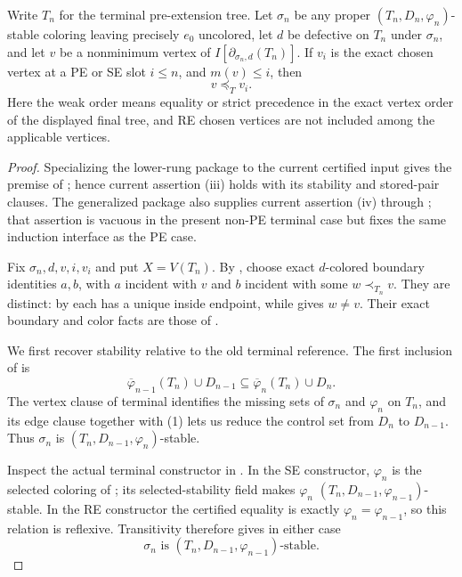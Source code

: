 \begin{helper}
Write \(T_n\) for the terminal pre-extension tree. Let \(\sigma_n\) be
any proper \((T_n,D_n,\varphi_n)\)-stable coloring leaving precisely
\(e_0\) uncolored, let \(d\) be defective on \(T_n\) under \(\sigma_n\),
and let \(v\) be a nonminimum vertex of
\(I[\partial_{\sigma_n,d}(T_n)]\). If \(v_i\) is the exact chosen
vertex at a PE or SE slot \(i\leq n\), and \(m(v)\leq i\), then
\[
                              v\preceq_T v_i .
\]
Here the weak order means equality or strict precedence in the exact
vertex order of the displayed final tree, and RE chosen vertices are not
included among the applicable vertices.
\end{helper}
\begin{proof}
Specializing the lower-rung package to the current certified input gives
the premise of ; hence current assertion (iii)
holds with its stability and stored-pair clauses. The generalized package
also supplies current assertion (iv) through ;
that assertion is vacuous in the present non-PE terminal case but fixes
the same induction interface as the PE case.

Fix \(\sigma_n,d,v,i,v_i\) and put \(X=V(T_n)\). By
, choose exact \(d\)-colored boundary
identities \(a,b\), with \(a\) incident with \(v\) and \(b\) incident
with some \(w\prec_{T_n}v\). They are distinct: by
 each has a unique inside endpoint, while
 gives \(w\ne v\). Their exact boundary and
color facts are those of .

We first recover stability relative to the old terminal reference.
The first inclusion of  is
\[
 \overline\varphi_{n-1}(T_n)\cup D_{n-1}
       \subseteq \overline\varphi_n(T_n)\cup D_n.               \tag{1}
\]
The vertex clause of terminal  identifies the
missing sets of \(\sigma_n\) and \(\varphi_n\) on \(T_n\), and its edge
clause together with (1) lets us reduce the control set from \(D_n\) to
\(D_{n-1}\). Thus \(\sigma_n\) is
\((T_n,D_{n-1},\varphi_n)\)-stable.

Inspect the actual terminal constructor in
. In the SE constructor,
\(\varphi_n\) is the selected coloring of
; its selected-stability field makes
\(\varphi_n\) \((T_n,D_{n-1},\varphi_{n-1})\)-stable. In the RE
constructor the certified equality is exactly
\(\varphi_n=\varphi_{n-1}\), so this relation is reflexive. Transitivity
 therefore gives in either case
\[
       \sigma_n\text{ is }
       (T_n,D_{n-1},\varphi_{n-1})\text{-stable}.               \tag{2}
\]


\end{proof}
